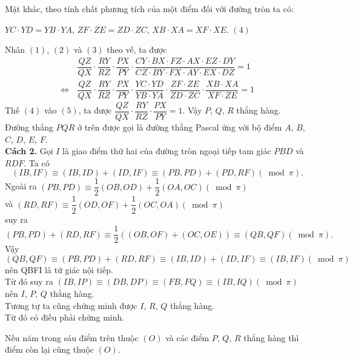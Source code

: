 Mặt khác, theo tính chất phương tích của một điểm đối với đường tròn ta có:
\begin{center}
$YC\cdot YD=YB\cdot YA$, $ZF\cdot ZE=ZD\cdot ZC$, $XB\cdot XA=XF\cdot XE.$ \hfill $ (4)$
\end{center}
Nhân $(1)$, $(2)$ và $(3)$ theo vế, ta được
\begin{align*}
&\dfrac{QZ}{QX}\cdot \dfrac{RY}{RZ}\cdot \dfrac{PX}{PY}\cdot \dfrac{CY\cdot BX\cdot FZ\cdot AX\cdot EZ\cdot DY}{CZ\cdot BY\cdot FX\cdot AY\cdot EX\cdot DZ}=1\\
\Leftrightarrow\, & \dfrac{QZ}{QX}\cdot \dfrac{RY}{RZ}\cdot \dfrac{PX}{PY}\cdot \dfrac{YC\cdot YD}{YB\cdot YA}\cdot \dfrac{ZF\cdot ZE}{ZD\cdot ZC}\cdot \dfrac{XB\cdot XA}{XF\cdot ZE}=1 \tag*{(5)}
\end{align*}
Thế $(4)$ vào $(5)$, ta được $\dfrac{QZ}{QX}\cdot \dfrac{RY}{RZ}\cdot \dfrac{PX}{PY}=1.$
Vậy $P$, $Q$, $R$ thẳng hàng.\\
Đường thẳng $PQR$ ở trên được gọi là đường thẳng Pascal ứng với bộ điểm $A$, $B$, $C$, $D$, $E$, $F$.\\
{\bf Cách 2.} Gọi $I$ là giao điểm thứ hai của đường tròn ngoại tiếp tam giác $PBD$ và $RDF$. Ta có 
$$\left(IB,IF\right)\equiv \left(IB,ID\right)+\left(ID,IF\right)\equiv \left(PB,PD\right)+\left(PD,RF\right)\left(\bmod \pi \right).$$
Ngoài ra $\left(PB,PD\right)\equiv \dfrac{1}{2}\left(OB,OD\right)+\dfrac{1}{2}\left(OA,OC\right)\left(\bmod \pi \right)$\\
và $\left(RD,RF\right)\equiv \dfrac{1}{2}\left(OD,OF\right)+\dfrac{1}{2}\left(OC,OA\right)\left(\bmod \pi \right)$\\
suy ra $\left(PB,PD\right)+\left(RD,RF\right)\equiv \dfrac{1}{2}\left(\left(OB,OF\right)+\left(OC,OE\right)\right)\equiv \left(QB,QF\right)\left(\bmod \pi \right).$\\
Vậy $\left(QB,QF\right)\equiv \left(PB,PD\right)+\left(RD,RF\right)\equiv \left(IB,ID\right)+\left(ID,IF\right)\equiv \left(IB,IF\right)\left(\bmod \pi \right)$ nên QBFI là tứ giác nội tiếp.\\
Từ đó suy ra $\left(IB,IP\right)\equiv \left(DB,DP\right)\equiv \left(FB,FQ\right)\equiv \left(IB,IQ\right)\left(\bmod \pi \right)$ nên $I$, $P$, $Q$ thẳng hàng.\\
Tương tự ta cũng chứng minh được $I$, $R$, $Q$ thẳng hàng.\\
Từ đó có điều phải chứng minh.
\begin{dl}
Nếu năm trong sáu điểm trên thuộc $(O)$ và các điểm $P$, $Q$, $R$ thẳng hàng thì điểm còn lại cũng thuộc $(O)$.
\end{dl}
